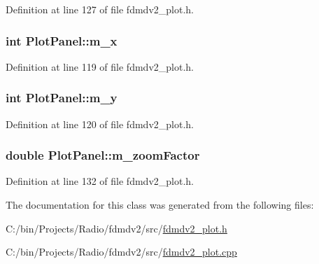 Definition at line 127 of file fdmdv2\-\_\-plot.\-h.

\hypertarget{class_plot_panel_abd0a64bd20aec2e300e383abfd60315d}{
\subsubsection[{m\-\_\-x}]{\setlength{\rightskip}{0pt plus 5cm}int Plot\-Panel\-::m\-\_\-x\hspace{0.3cm}{\ttfamily [protected]}}}\label{class_plot_panel_abd0a64bd20aec2e300e383abfd60315d}


Definition at line 119 of file fdmdv2\-\_\-plot.\-h.

\hypertarget{class_plot_panel_a822981fef8ff50da327b3dbca9fd2777}{
\subsubsection[{m\-\_\-y}]{\setlength{\rightskip}{0pt plus 5cm}int Plot\-Panel\-::m\-\_\-y\hspace{0.3cm}{\ttfamily [protected]}}}\label{class_plot_panel_a822981fef8ff50da327b3dbca9fd2777}


Definition at line 120 of file fdmdv2\-\_\-plot.\-h.

\hypertarget{class_plot_panel_ae2f4907a8e4ed958ef4995e99b1f7148}{
\subsubsection[{m\-\_\-zoom\-Factor}]{\setlength{\rightskip}{0pt plus 5cm}double Plot\-Panel\-::m\-\_\-zoom\-Factor\hspace{0.3cm}{\ttfamily [protected]}}}\label{class_plot_panel_ae2f4907a8e4ed958ef4995e99b1f7148}


Definition at line 132 of file fdmdv2\-\_\-plot.\-h.



The documentation for this class was generated from the following files\-:\begin{DoxyCompactItemize}
\item 
C\-:/bin/\-Projects/\-Radio/fdmdv2/src/\hyperlink{fdmdv2__plot_8h}{fdmdv2\-\_\-plot.\-h}\item 
C\-:/bin/\-Projects/\-Radio/fdmdv2/src/\hyperlink{fdmdv2__plot_8cpp}{fdmdv2\-\_\-plot.\-cpp}\end{DoxyCompactItemize}
